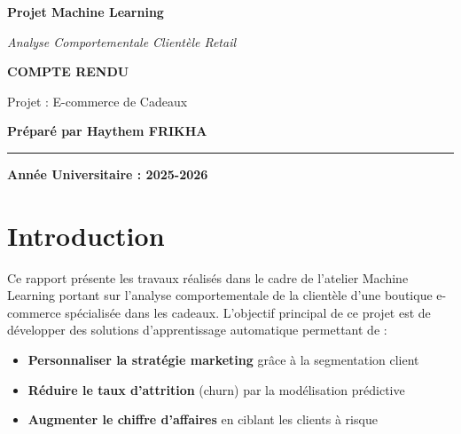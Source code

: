 \documentclass[12pt,a4paper]{article}
\begin{document}
\begin{titlepage}
\vspace{2cm}

\begin{center}
{\Huge\textbf{Projet Machine Learning}}\par
\vspace{0.5cm}
{\Large\textit{Analyse Comportementale Clientèle Retail}}\par

\vspace{4cm}

{\LARGE\textbf{COMPTE RENDU}}\par
\vspace{1cm}
{\large Projet : E-commerce de Cadeaux}\par
\vspace{2cm}
{\large \textbf{Préparé par Haythem FRIKHA}}
\vspace{3cm}

\rule{10cm}{2pt}

\vspace{5cm}

{\textbf{Année Universitaire : 2025-2026}}

\end{center}
\vfill
\end{titlepage}

\tableofcontents
\newpage

\section{Introduction}

Ce rapport présente les travaux réalisés dans le cadre de l'atelier Machine Learning portant sur l'analyse comportementale de la clientèle d'une boutique e-commerce spécialisée dans les cadeaux. L'objectif principal de ce projet est de développer des solutions d'apprentissage automatique permettant de :

\begin{itemize}
    \item \textbf{Personnaliser la stratégie marketing} grâce à la segmentation client
    \item \textbf{Réduire le taux d'attrition} (churn) par la modélisation prédictive
    \item \textbf{Augmenter le chiffre d'affaires} en ciblant les clients à risque
\end{itemize}
\end{document}
